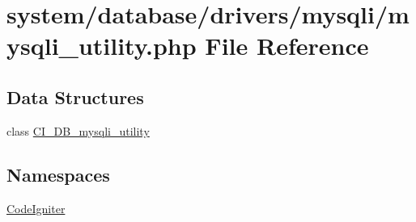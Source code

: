 \hypertarget{mysqli__utility_8php}{}\section{system/database/drivers/mysqli/mysqli\+\_\+utility.php File Reference}
\label{mysqli__utility_8php}
\subsection*{Data Structures}
\begin{DoxyCompactItemize}
\item 
class \mbox{\hyperlink{class_c_i___d_b__mysqli__utility}{C\+I\+\_\+\+D\+B\+\_\+mysqli\+\_\+utility}}
\end{DoxyCompactItemize}
\subsection*{Namespaces}
\begin{DoxyCompactItemize}
\item 
 \mbox{\hyperlink{namespace_code_igniter}{Code\+Igniter}}
\end{DoxyCompactItemize}
